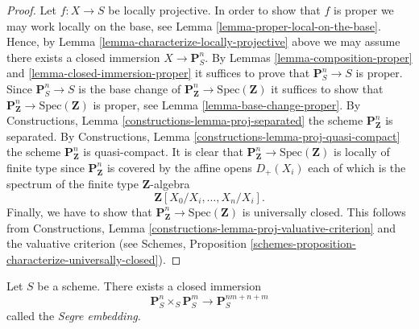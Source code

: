 \begin{proof}
Let $f : X \to S$ be locally projective.
In order to show that $f$ is proper we may work locally on the
base, see Lemma \ref{lemma-proper-local-on-the-base}.
Hence, by Lemma \ref{lemma-characterize-locally-projective}
above we may assume there exists a closed immersion $X \to \mathbf{P}^n_S$.
By Lemmas \ref{lemma-composition-proper}
and \ref{lemma-closed-immersion-proper} it suffices to prove that
$\mathbf{P}^n_S \to S$ is proper. Since
$\mathbf{P}^n_S \to S$ is the base change of
$\mathbf{P}^n_{\mathbf{Z}} \to \text{Spec}(\mathbf{Z})$ it suffices
to show that $\mathbf{P}^n_{\mathbf{Z}} \to \text{Spec}(\mathbf{Z})$
is proper, see Lemma \ref{lemma-base-change-proper}.
By Constructions, Lemma \ref{constructions-lemma-proj-separated} the scheme
$\mathbf{P}^n_{\mathbf{Z}}$ is separated.
By Constructions, Lemma \ref{constructions-lemma-proj-quasi-compact} the scheme
$\mathbf{P}^n_{\mathbf{Z}}$ is quasi-compact.
It is clear that $\mathbf{P}^n_{\mathbf{Z}} \to \text{Spec}(\mathbf{Z})$
is locally of finite type since $\mathbf{P}^n_{\mathbf{Z}}$ is
covered by the affine opens $D_{+}(X_i)$ each of which is the
spectrum of the finite type $\mathbf{Z}$-algebra
$$
\mathbf{Z}[X_0/X_i, \ldots, X_n/X_i].
$$
Finally, we have to show that
$\mathbf{P}^n_{\mathbf{Z}} \to \text{Spec}(\mathbf{Z})$
is universally closed. This follows from
Constructions, Lemma \ref{constructions-lemma-proj-valuative-criterion}
and the valuative criterion (see Schemes,
Proposition \ref{schemes-proposition-characterize-universally-closed}).
\end{proof}

\begin{lemma}
\label{lemma-segre-embedding}
Let $S$ be a scheme. There exists a closed immersion
$$
\mathbf{P}^n_S \times_S \mathbf{P}^m_S
\longrightarrow
\mathbf{P}^{nm + n + m}_S
$$
called the {\it Segre embedding}.
\end{lemma}

